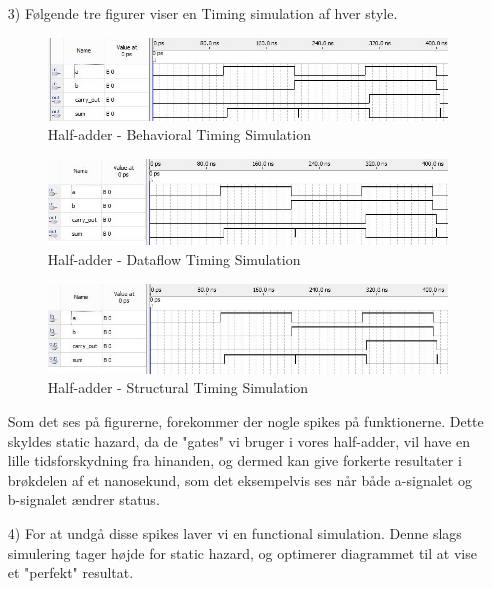 \begin{enumerate}
	\item[3)]
	Følgende tre figurer viser en Timing simulation af hver style. \\
\begin{figure}[h]
	\centering
	\includegraphics[scale=0.6]{pictures/Oevelse1/Half_adder/Behavioral_timing_simulation.jpg}
	\caption{Half-adder - Behavioral Timing Simulation}
	\label{fig:HaBehavioralTimingSim}
\end{figure}
\begin{figure}[h]
	\centering
	\includegraphics[scale=0.6]{pictures/Oevelse1/Half_adder/Dataflow_timing_simulation.jpg}
	\caption{Half-adder - Dataflow Timing Simulation}
	\label{fig:HaDatalfowTimingSim}
\end{figure}
\begin{figure}[h]
	\centering
	\includegraphics[scale=0.6]{pictures/Oevelse1/Half_adder/Structural_timing_simulation.jpg}
	\caption{Half-adder - Structural Timing Simulation}
	\label{fig:HaStructuralTimingSim}
\end{figure}
	\newpage
	Som det ses på figurerne, forekommer der nogle spikes på funktionerne. Dette skyldes static hazard, da de "gates" vi bruger i vores half-adder, vil have en lille tidsforskydning fra hinanden, og dermed kan give forkerte resultater i brøkdelen af et nanosekund, som det eksempelvis ses når både a-signalet og b-signalet ændrer status.
	\item[4)] 
	For at undgå disse spikes laver vi en functional simulation. Denne slags simulering tager højde for static hazard, og optimerer diagrammet til at vise et "perfekt" resultat.\\

\end{enumerate}

